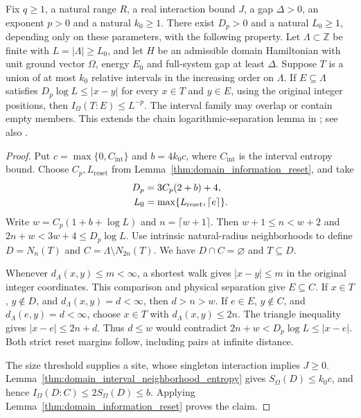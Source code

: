 \begin{lemma}
    \label{thm:domain_logarithmic_separation}
    \leanok
    Fix $q\ge1$, a natural range $R$, a real interaction bound $J$, a gap
    $\Delta>0$, an exponent $p>0$ and a natural $k_0\ge1$.
    There exist $D_p>0$ and a natural $L_0\ge1$, depending only on these
    parameters, with the following property. Let $\Lambda\subset\mathbb Z$
    be finite with $L=|\Lambda|\ge L_0$, and let $H$ be an admissible
    domain Hamiltonian with unit ground vector $\Omega$, energy $E_0$ and
    full-system gap at least $\Delta$.
    Suppose $T$ is a union of at most $k_0$ relative intervals in the
    increasing order on $\Lambda$. If $E\subseteq\Lambda$ satisfies
    $D_p\log L\le|x-y|$ for every $x\in T$ and $y\in E$, using the original
    integer positions, then $I_\Omega(T:E)\le L^{-p}$.
    The interval family may overlap or contain empty members.
    This extends the chain logarithmic-separation lemma in
    \cite[Part~IIa]{TNLean2026OneDimensional}; see also
    \cite{gap:tnlean_one_dimensional_connected_domain_scope}.
\end{lemma}
\begin{proof}\leanok
    Put $c=\max\{0,C_{\mathrm{int}}\}$ and $b=4k_0c$, where
    $C_{\mathrm{int}}$ is the interval entropy bound.
    Choose $C_p,L_{\mathrm{reset}}$ from
    Lemma~\ref{thm:domain_information_reset}, and take
    \begin{align}
        D_p & =3C_p(2+b)+4,\notag                               \\
        L_0 & =\max\{L_{\mathrm{reset}},\lceil e\rceil\}.\notag
    \end{align}
    Write $w=C_p(1+b+\log L)$ and $n=\lceil w+1\rceil$.
    Then $w+1\le n<w+2$ and $2n+w<3w+4\le D_p\log L$.
    Use intrinsic natural-radius neighborhoods to define
    $D=N_n(T)$ and $C=\Lambda\setminus N_{2n}(T)$.
    We have $D\cap C=\varnothing$ and $T\subseteq D$.

    Whenever $d_\Lambda(x,y)\le m<\infty$, a shortest walk gives
    $|x-y|\le m$ in the original integer coordinates.
    This comparison and physical separation give $E\subseteq C$.
    If $x\in T$, $y\notin D$, and $d_\Lambda(x,y)=d<\infty$, then $d>n>w$.
    If $e\in E$, $y\notin C$, and $d_\Lambda(e,y)=d<\infty$, choose
    $x\in T$ with $d_\Lambda(x,y)\le2n$. The triangle inequality gives
    $|x-e|\le2n+d$. Thus $d\le w$ would contradict
    $2n+w<D_p\log L\le|x-e|$.
    Both strict reset margins follow, including pairs at infinite distance.

    The size threshold supplies a site, whose singleton interaction implies
    $J\ge0$. Lemma~\ref{thm:domain_interval_neighborhood_entropy} gives
    $S_\Omega(D)\le k_0c$, and hence
    $I_\Omega(D:C)\le2S_\Omega(D)\le b$.
    Applying Lemma~\ref{thm:domain_information_reset} proves the claim.
\end{proof}

